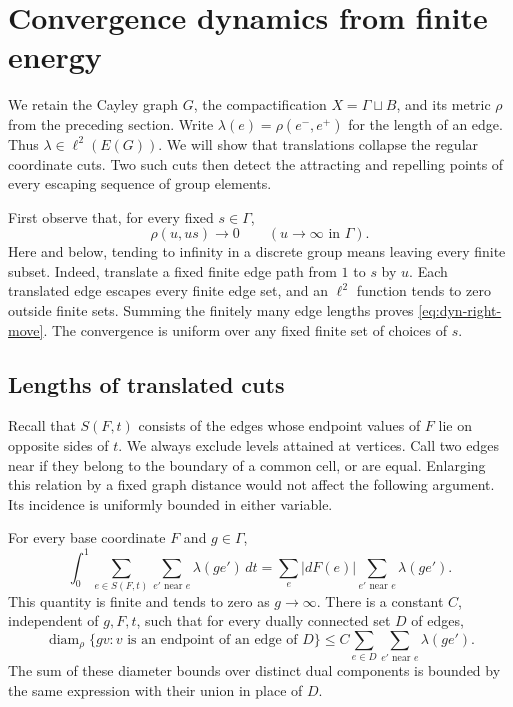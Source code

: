 \section{Convergence dynamics from finite energy}
\label{sec:dynamics}

We retain the Cayley graph $G$, the compactification $X=\Gamma\sqcup B$,
and its metric $\rho$ from the preceding section. Write
$\lambda(e)=\rho(e^-,e^+)$ for the length of an edge. Thus
$\lambda\in\ell^2(E(G))$. We will show that translations collapse the
regular coordinate cuts. Two such cuts then detect the attracting and
repelling points of every escaping sequence of group elements.

First observe that, for every fixed $s\in\Gamma$,
\begin{equation}
 \rho(u,us)\longrightarrow0\qquad(u\longrightarrow\infty\text{ in }\Gamma).
 \label{eq:dyn-right-move}
\end{equation}
Here and below, tending to infinity in a discrete group means leaving
every finite subset. Indeed, translate a fixed finite edge path from $1$
to $s$ by $u$. Each translated edge escapes every finite edge set, and an
$\ell^2$ function tends to zero outside finite sets. Summing the finitely
many edge lengths proves \eqref{eq:dyn-right-move}. The convergence is
uniform over any fixed finite set of choices of $s$.

\subsection{Lengths of translated cuts}

Recall that $S(F,t)$ consists of the edges whose endpoint values of $F$
lie on opposite sides of $t$. We always exclude levels attained at
vertices. Call two edges near if they belong to the boundary of a common
cell, or are equal. Enlarging this relation by a fixed graph distance
would not affect the following argument. Its incidence is uniformly
bounded in either variable.

\begin{lemma}\label{dyn:length}
For every base coordinate $F$ and $g\in\Gamma$,
\begin{equation}
 \int_0^1\sum_{e\in S(F,t)}\sum_{e'\text{ near }e}
       \lambda(ge')\,dt
 =\sum_e |dF(e)|\sum_{e'\text{ near }e}\lambda(ge').
 \label{eq:dyn-length}
\end{equation}
This quantity is finite and tends to zero as $g\to\infty$.
There is a constant $C$, independent of $g,F,t$, such that for every
dually connected set $D$ of edges,
\begin{equation}
 \operatorname{diam}_{\rho}\{gv:v\text{ is an endpoint of an edge of }D\}
 \le C\sum_{e\in D}\sum_{e'\text{ near }e}\lambda(ge').
 \label{eq:dyn-dual-diameter}
\end{equation}
The sum of these diameter bounds over distinct dual components is
bounded by the same expression with their union in place of $D$.
\end{lemma}

